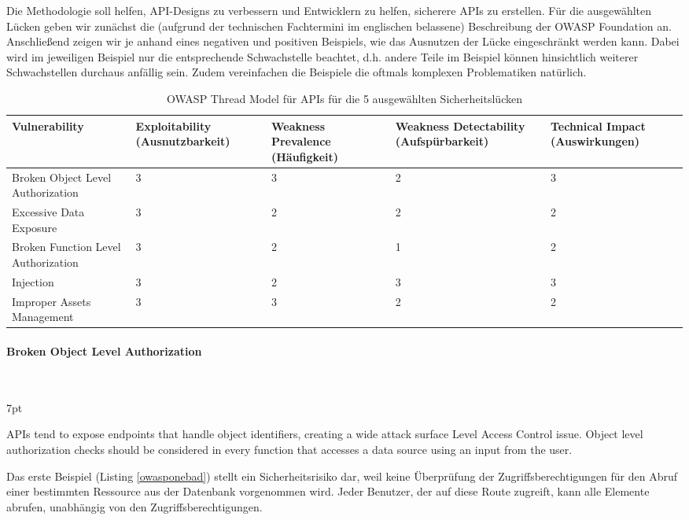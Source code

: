 \documentclass[notitlepage, hidelinks]{article}
\newenvironment{formal}{%
  \def\FrameCommand{%
    \hspace{1pt}%
    {\color{black}\vrule width 2pt}%
    {\color{formalshade}\vrule width 4pt}%
    \colorbox{formalshade}%
  }%
  \MakeFramed{\advance\hsize-\width\FrameRestore}%
  \noindent\hspace{-4.55pt}%
  \begin{adjustwidth}{}{7pt}%
  \vspace{2pt}\vspace{2pt}%
}
{%
  \vspace{2pt}\end{adjustwidth}\endMakeFramed%
}
\begin{document}
Die Methodologie soll helfen, API-Designs zu verbessern und Entwicklern zu helfen, sicherere APIs zu erstellen. Für die ausgewählten Lücken geben wir zunächst die (aufgrund der technischen Fachtermini im englischen belassene) Beschreibung der OWASP Foundation an. Anschließend zeigen wir je anhand eines negativen und positiven Beispiels, wie das Ausnutzen der Lücke eingeschränkt werden kann. Dabei wird im jeweiligen Beispiel nur die entsprechende Schwachstelle beachtet, d.h. andere Teile im Beispiel können hinsichtlich weiterer Schwachstellen durchaus anfällig sein. Zudem vereinfachen die Beispiele die oftmals komplexen Problematiken natürlich.


\begin{table}[H]
\begin{center}
\begin{tabular}{| L{2.3cm} | L{2.3cm} | L{2.3cm} | L{2.3cm} | L{2.3cm} |}
\hline
Vulnerability & Exploitability (Ausnutzbarkeit) & Weakness Prevalence (Häufigkeit) & Weakness Detectability (Aufspürbarkeit) & Technical Impact (Auswirkungen) \\ \hline
Broken Object Level Authorization & 3 & 3 & 2 & 3 \\ \hline
Excessive Data Exposure & 3 & 2 & 2 & 2 \\ \hline
Broken Function Level Authorization & 3 & 2 & 1 & 2 \\ \hline
Injection & 3 & 2 & 3 & 3 \\ \hline
Improper Assets Management & 3 & 3 & 2 & 2 \\ \hline
\end{tabular}
\caption{OWASP Thread Model für APIs für die 5 ausgewählten Sicherheitslücken}
\label{threadmodel}
\end{center}
\end{table}

\paragraph{Broken Object Level Authorization} \mbox{} \\

\begin{formal}
APIs tend to expose endpoints that handle object identifiers, creating a wide attack surface Level Access Control issue. Object level authorization checks should be considered in every function that accesses a data source using an input from the user.
\end{formal}

Das erste Beispiel (Listing \ref{owasponebad}) stellt ein Sicherheitsrisiko dar, weil keine Überprüfung der Zugriffsberechtigungen für den Abruf einer bestimmten Ressource aus der Datenbank vorgenommen wird. Jeder Benutzer, der auf diese Route zugreift, kann alle Elemente abrufen, unabhängig von den Zugriffsberechtigungen.
\end{document}
